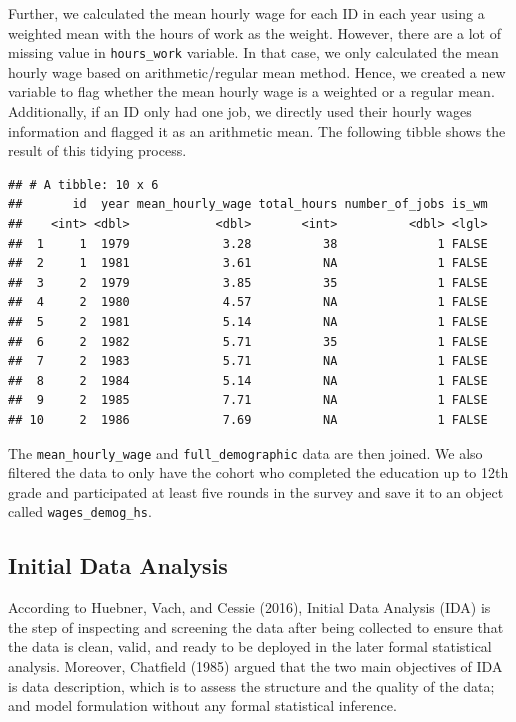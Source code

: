 \documentclass{article}
\begin{document}
Further, we calculated the mean hourly wage for each ID in each year using a weighted mean with the hours of work as the weight. However, there are a lot of missing value in \texttt{hours\_work} variable. In that case, we only calculated the mean hourly wage based on arithmetic/regular mean method. Hence, we created a new variable to flag whether the mean hourly wage is a weighted or a regular mean. Additionally, if an ID only had one job, we directly used their hourly wages information and flagged it as an arithmetic mean. The following tibble shows the result of this tidying process.

\begin{verbatim}
## # A tibble: 10 x 6
##       id  year mean_hourly_wage total_hours number_of_jobs is_wm
##    <int> <dbl>            <dbl>       <int>          <dbl> <lgl>
##  1     1  1979             3.28          38              1 FALSE
##  2     1  1981             3.61          NA              1 FALSE
##  3     2  1979             3.85          35              1 FALSE
##  4     2  1980             4.57          NA              1 FALSE
##  5     2  1981             5.14          NA              1 FALSE
##  6     2  1982             5.71          35              1 FALSE
##  7     2  1983             5.71          NA              1 FALSE
##  8     2  1984             5.14          NA              1 FALSE
##  9     2  1985             7.71          NA              1 FALSE
## 10     2  1986             7.69          NA              1 FALSE
\end{verbatim}

The \texttt{mean\_hourly\_wage} and \texttt{full\_demographic} data are then joined. We also filtered the data to only have the cohort who completed the education up to 12th grade and participated at least five rounds in the survey and save it to an object called \texttt{wages\_demog\_hs}.

\hypertarget{initial-data-analysis}{%
\subsection{Initial Data Analysis}\label{initial-data-analysis}}

According to Huebner, Vach, and Cessie (2016), Initial Data Analysis (IDA) is the step of inspecting and screening the data after being collected to ensure that the data is clean, valid, and ready to be deployed in the later formal statistical analysis. Moreover, Chatfield (1985) argued that the two main objectives of IDA is data description, which is to assess the structure and the quality of the data; and model formulation without any formal statistical inference.
\end{document}
